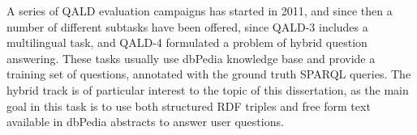 A series of QALD evaluation campaigns has started in 2011, and since then a number of different subtasks have been offered, \ie since QALD-3 includes a multilingual task, and QALD-4 formulated a problem of hybrid question answering.
These tasks usually use dbPedia knowledge base and provide a training set of questions, annotated with the ground truth SPARQL queries.
The hybrid track is of particular interest to the topic of this dissertation, as the main goal in this task is to use both structured RDF triples and free form text available in dbPedia abstracts to answer user questions.


